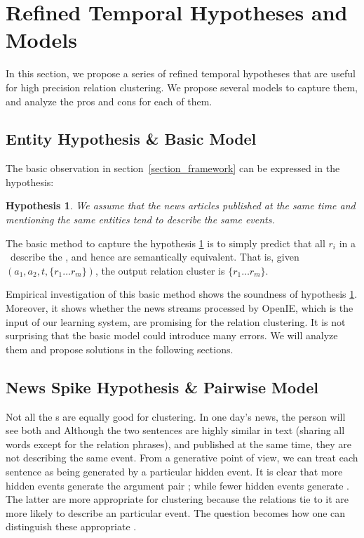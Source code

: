 \section{Refined Temporal Hypotheses and Models}
\label{section_temporal}
In this section, we propose a series of refined temporal hypotheses that are useful for high precision relation clustering. We propose several models to capture them, and analyze the pros and cons for each of them.

\subsection{Entity Hypothesis \& Basic Model}
\label{section_basic_model}

The basic observation in section~\ref{section_framework} can be expressed in the hypothesis:

\newtheorem{hypothesis}{Hypothesis}
\begin{hypothesis}
	\label{hypo_one}
	We assume that the news articles published at the same time and mentioning the same entities tend to describe the same events.
\end{hypothesis}


The basic method to capture the hypothesis \ref{hypo_one} is to simply predict that all $r_i$ in a \bag\ describe the \eec, and hence are semantically equivalent. That is, given \bag\ $(a_1,a_2,t,\{r_1\ldots r_m\})$, the output relation cluster is $\{r_1\ldots r_m\}$.

Empirical investigation of this basic method shows the soundness of hypothesis \ref{hypo_one}. Moreover, it shows whether the news streams processed by OpenIE, which is the input of our learning system, are promising for the relation clustering. It is not surprising that the basic model could introduce many errors. We will analyze them and propose solutions in the following sections.

\subsection{News Spike Hypothesis \& Pairwise Model}
\label{section_news_spike}
Not all the \Eec s are equally good for clustering. In one day's news, the person will see both  and  Although the two sentences are highly similar in text (sharing all words except for the relation phrases), and published at the same time, they are not describing the same event. From a generative point of view, we can treat each sentence as being generated by a particular hidden event. It is clear that more hidden events generate the argument pair ; while fewer hidden events generate . The latter are more appropriate for clustering because the relations tie to it are more likely to describe an particular event. The question becomes how one can distinguish these appropriate \eec.

